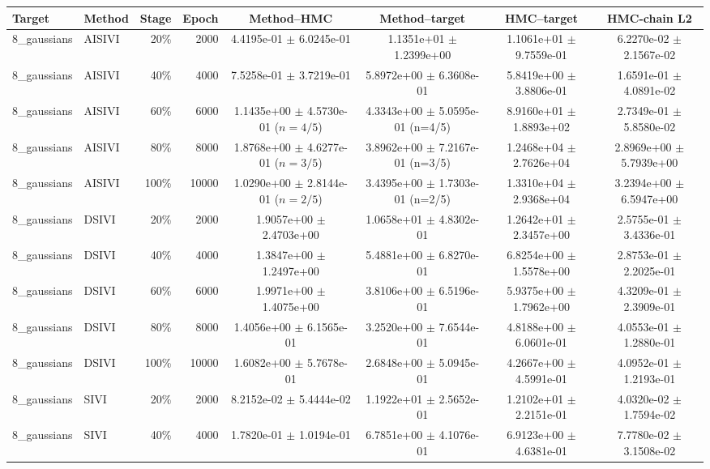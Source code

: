 \begin{tabular}{llrrcccc}
\toprule
Target & Method & Stage & Epoch & Method--HMC & Method--target & HMC--target & HMC-chain L2 \\
\midrule
8\_gaussians & AISIVI & 20\% & 2000 & 4.4195e-01 $\pm$ 6.0245e-01 & 1.1351e+01 $\pm$ 1.2399e+00 & 1.1061e+01 $\pm$ 9.7559e-01 & 6.2270e-02 $\pm$ 2.1567e-02 \\
8\_gaussians & AISIVI & 40\% & 4000 & 7.5258e-01 $\pm$ 3.7219e-01 & 5.8972e+00 $\pm$ 6.3608e-01 & 5.8419e+00 $\pm$ 3.8806e-01 & 1.6591e-01 $\pm$ 4.0891e-02 \\
8\_gaussians & AISIVI & 60\% & 6000 & 1.1435e+00 $\pm$ 4.5730e-01 ($n=4/5$) & 4.3343e+00 $\pm$ 5.0595e-01 (n=4/5) & 8.9160e+01 $\pm$ 1.8893e+02 & 2.7349e-01 $\pm$ 5.8580e-02 \\
8\_gaussians & AISIVI & 80\% & 8000 & 1.8768e+00 $\pm$ 4.6277e-01 ($n=3/5$) & 3.8962e+00 $\pm$ 7.2167e-01 (n=3/5) & 1.2468e+04 $\pm$ 2.7626e+04 & 2.8969e+00 $\pm$ 5.7939e+00 \\
8\_gaussians & AISIVI & 100\% & 10000 & 1.0290e+00 $\pm$ 2.8144e-01 ($n=2/5$) & 3.4395e+00 $\pm$ 1.7303e-01 (n=2/5) & 1.3310e+04 $\pm$ 2.9368e+04 & 3.2394e+00 $\pm$ 6.5947e+00 \\
8\_gaussians & DSIVI & 20\% & 2000 & 1.9057e+00 $\pm$ 2.4703e+00 & 1.0658e+01 $\pm$ 4.8302e-01 & 1.2642e+01 $\pm$ 2.3457e+00 & 2.5755e-01 $\pm$ 3.4336e-01 \\
8\_gaussians & DSIVI & 40\% & 4000 & 1.3847e+00 $\pm$ 1.2497e+00 & 5.4881e+00 $\pm$ 6.8270e-01 & 6.8254e+00 $\pm$ 1.5578e+00 & 2.8753e-01 $\pm$ 2.2025e-01 \\
8\_gaussians & DSIVI & 60\% & 6000 & 1.9971e+00 $\pm$ 1.4075e+00 & 3.8106e+00 $\pm$ 6.5196e-01 & 5.9375e+00 $\pm$ 1.7962e+00 & 4.3209e-01 $\pm$ 2.3909e-01 \\
8\_gaussians & DSIVI & 80\% & 8000 & 1.4056e+00 $\pm$ 6.1565e-01 & 3.2520e+00 $\pm$ 7.6544e-01 & 4.8188e+00 $\pm$ 6.0601e-01 & 4.0553e-01 $\pm$ 1.2880e-01 \\
8\_gaussians & DSIVI & 100\% & 10000 & 1.6082e+00 $\pm$ 5.7678e-01 & 2.6848e+00 $\pm$ 5.0945e-01 & 4.2667e+00 $\pm$ 4.5991e-01 & 4.0952e-01 $\pm$ 1.2193e-01 \\
8\_gaussians & SIVI & 20\% & 2000 & 8.2152e-02 $\pm$ 5.4444e-02 & 1.1922e+01 $\pm$ 2.5652e-01 & 1.2102e+01 $\pm$ 2.2151e-01 & 4.0320e-02 $\pm$ 1.7594e-02 \\
8\_gaussians & SIVI & 40\% & 4000 & 1.7820e-01 $\pm$ 1.0194e-01 & 6.7851e+00 $\pm$ 4.1076e-01 & 6.9123e+00 $\pm$ 4.6381e-01 & 7.7780e-02 $\pm$ 3.1508e-02 \\

\end{tabular}
